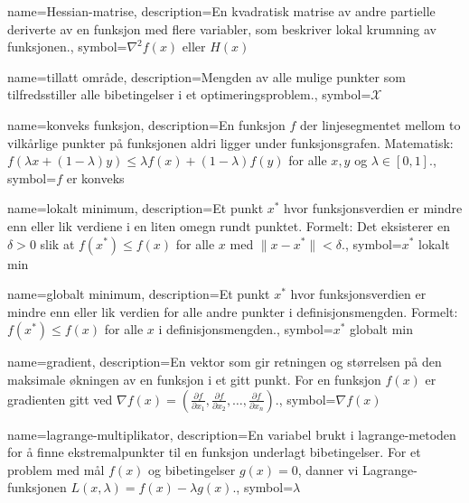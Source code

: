 {
    name=Hessian-matrise,
    description={En kvadratisk matrise av andre partielle deriverte av en funksjon med flere variabler, som beskriver lokal krumning av funksjonen.},
    symbol={\( \nabla^2 f(x) \) eller \( H(x) \)}
}

{
    name=tillatt område,
    description={Mengden av alle mulige punkter som tilfredsstiller alle bibetingelser i et optimeringsproblem.},
    symbol={\( \mathcal{X} \)}
}

{
    name=konveks funksjon,
    description={En funksjon \( f \) der linjesegmentet mellom to vilkårlige punkter på funksjonen aldri ligger under funksjonsgrafen. Matematisk: \( f(\lambda x + (1-\lambda)y) \leq \lambda f(x) + (1-\lambda)f(y) \) for alle \( x, y \) og \( \lambda \in [0,1] \).},
    symbol={\( f \) er konveks}
}

{
    name=lokalt minimum,
    description={Et punkt \( x^* \) hvor funksjonsverdien er mindre enn eller lik verdiene i en liten omegn rundt punktet. Formelt: Det eksisterer en \( \delta > 0 \) slik at \( f(x^*) \leq f(x) \) for alle \( x \) med \( \|x - x^*\| < \delta \).},
    symbol={\( x^* \) lokalt min}
}

{
    name=globalt minimum,
    description={Et punkt \( x^* \) hvor funksjonsverdien er mindre enn eller lik verdien for alle andre punkter i definisjonsmengden. Formelt: \( f(x^*) \leq f(x) \) for alle \( x \) i definisjonsmengden.},
    symbol={\( x^* \) globalt min}
}

{
    name=gradient,
    description={En vektor som gir retningen og størrelsen på den maksimale økningen av en funksjon i et gitt punkt. For en funksjon \( f(x) \) er gradienten gitt ved \( \nabla f(x) = (\frac{\partial f}{\partial x_1}, \frac{\partial f}{\partial x_2}, \ldots, \frac{\partial f}{\partial x_n}) \).},
    symbol={\( \nabla f(x) \)}
}

{
    name=lagrange-multiplikator,
    description={En variabel brukt i lagrange-metoden for å finne ekstremalpunkter til en funksjon underlagt bibetingelser. For et problem med mål \( f(x) \) og bibetingelser \( g(x) = 0 \), danner vi Lagrange-funksjonen \( L(x, \lambda) = f(x) - \lambda g(x) \).},
    symbol={\( \lambda \)}
}

